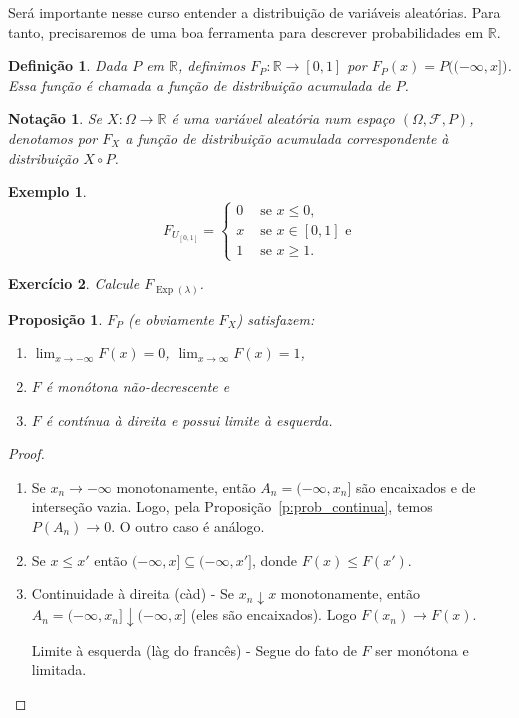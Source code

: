 \documentclass[reqno]{article}
\newcommand*\1{\mathds{1}}
\newtheorem{proposition}[theorem]{Proposição}
\newtheorem{definition}[theorem]{Definição}
\newtheorem{notation}[theorem]{Notação}
\DeclareMathOperator{\Exp}{Exp}
\newtheorem{example}{Exemplo}[section]
\newtheorem{exercise}[example]{Exercício}
\begin{document}
Será importante nesse curso entender a distribuição de variáveis aleatórias.
Para tanto, precisaremos de uma boa ferramenta para descrever probabilidades em $\mathbb{R}$.

\begin{definition}
  Dada $P$ em $\mathbb{R}$, definimos $F_P:\mathbb{R} \to [0,1]$ por $F_P(x) = P\big((-\infty, x]\big)$.
  Essa função é chamada a função de distribuição acumulada de $P$.
\end{definition}

\begin{notation}
  Se $X:\Omega \to \mathbb{R}$ é uma variável aleatória num espaço $(\Omega, \mathcal{F}, P)$, denotamos por $F_X$ a função de distribuição acumulada correspondente à distribuição $X \circ P$.
\end{notation}

\begin{example}
  \begin{equation}
  F_{U_{[0,1]}} =
  \begin{cases}
    0 & \text{ se $x \leq 0$,}\\
    x & \text{ se $x \in [0,1]$ e}\\
    1 & \text{ se $x \geq 1$.}
  \end{cases}
\end{equation}
\end{example}

\begin{exercise}
  Calcule $F_{\Exp(\lambda)}$.
\end{exercise}

\begin{proposition}
  \label{p:propried_F}
  $F_P$ (e obviamente $F_X$) satisfazem:
  \begin{enumerate}
  \item $\lim_{x \to -\infty} F(x) = 0$, $\lim_{x \to \infty} F(x) = 1$,
  \item $F$ é monótona não-decrescente e
  \item $F$ é contínua à direita e possui limite à esquerda.
  \end{enumerate}
\end{proposition}

\begin{proof}
  \begin{enumerate}
  \item Se $x_n \to -\infty$ monotonamente, então $A_n = (-\infty, x_n]$ são encaixados e de interseção vazia.
    Logo, pela Proposição~\ref{p:prob_continua}, temos $P(A_n) \to 0$.
    O outro caso é análogo.
  \item Se $x \leq x'$ então $(-\infty, x] \subseteq (-\infty,x']$, donde $F(x) \leq F(x')$.
  \item Continuidade à direita (càd) - Se $x_n \downarrow x$ monotonamente, então $A_n = (-\infty, x_n] \downarrow (-\infty, x]$ (eles são encaixados).
    Logo $F(x_n) \to F(x)$.

    Limite à esquerda (làg do francês) - Segue do fato de $F$ ser monótona e limitada.
  \end{enumerate}
\end{proof}
\end{document}
